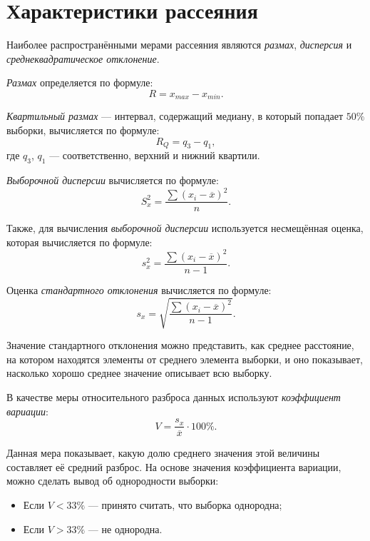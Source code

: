 \section*{Характеристики рассеяния}

Наиболее распространёнными мерами рассеяния являются \textit{размах}, \textit{дисперсия} и \textit{среднеквадратическое отклонение}.

\textit{Размах} определяется по формуле:
\begin{equation*}
	R = x_{max} - x_{min}.
\end{equation*}

\textit{Квартильный размах} --- интервал, содержащий медиану, в который попадает $50\%$ выборки, вычисляется по формуле: 
\begin{equation*}
	R_Q = q_3 - q_1,
\end{equation*}
где $q_3$, $q_1$ --- соответственно, верхний и нижний квартили.

\textit{Выборочной дисперсии} вычисляется по формуле:
\begin{equation*}
	S_x^2 = \frac{\sum{(x_i - \overline{x})^2}}{n}.
\end{equation*}

Также, для вычисления \textit{выборочной дисперсии} используется несмещённая оценка, которая вычисляется по формуле:
\begin{equation*}
	s_x^2 = \frac{\sum{(x_i - \overline{x})^2}}{n - 1}.
\end{equation*}

Оценка \textit{стандартного отклонения} вычисляется по формуле:
\begin{equation*}
	s_x = \sqrt{\frac{\sum{(x_i - \overline{x})^2}}{n - 1}}.
\end{equation*}

Значение стандартного отклонения можно представить, как среднее расстояние, на котором находятся элементы от среднего элемента выборки, и оно показывает, насколько хорошо среднее значение описывает всю выборку.

В качестве меры относительного разброса данных используют \textit{коэффициент вариации}:
\begin{equation*}
	V = \frac{s_x}{\overline{x}} \cdot 100\%.
\end{equation*}

Данная мера показывает, какую долю среднего значения этой величины составляет её средний разброс. На основе значения коэффициента вариации, можно сделать вывод об однородности выборки: 
\begin{itemize}
	\item Если $V < 33\%$ --- принято считать, что выборка однородна;
	\item Если $V > 33\%$ --- не однородна.
\end{itemize}

